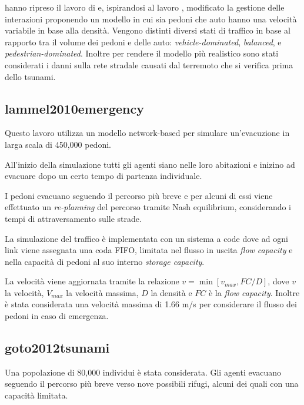 \textcite{wang2021novel} hanno ripreso il lavoro di \textcite{wang2016agent} e, 
ispirandosi al lavoro \textcite{goto2012tsunami}, modificato la gestione delle interazioni proponendo un modello in cui sia pedoni che auto hanno una velocità variabile in base alla densità.
Vengono distinti diversi stati di traffico in base al rapporto tra il volume dei pedoni e delle auto: \textit{vehicle-dominated}, \textit{balanced}, e \textit{pedestrian-dominated}. 
Inoltre per rendere il modello più realistico sono stati considerati i danni sulla rete stradale causati dal terremoto che si verifica prima dello tsunami.


\subsection{lammel2010emergency}
Questo lavoro utilizza un modello network-based per simulare un'evacuzione in larga scala di 450,000 pedoni.

All'inizio della simulazione tutti gli agenti siano nelle loro abitazioni 
e inizino ad evacuare dopo un certo tempo di partenza individuale.

I pedoni evacuano seguendo il percorso più breve e per alcuni di essi viene effettuato un \textit{re-planning} del percorso tramite Nash equilibrium,
considerando i tempi di attraversamento sulle strade.

La simulazione del traffico è implementata con un sistema a code dove ad ogni link viene assegnata una coda FIFO, 
limitata nel flusso in uscita \textit{flow capacity} e nella capacità di pedoni al suo interno \textit{storage capacity}.

La velocità viene aggiornata tramite la relazione $v = \min[v_{max}, FC / D]$, dove $v$ la velocità,
$V_{max}$ la velocità massima, $D$ la densità e $FC$ è la \textit{flow capacity}.
%
Inoltre è stata considerata una velocità massima di 1.66 m/s per considerare il
flusso dei pedoni in caso di emergenza.

\newpage


\subsection{goto2012tsunami}
Una popolazione di 80,000 individui è stata considerata.
Gli agenti evacuano seguendo il percorso più breve verso nove possibili rifugi, alcuni dei quali con una capacità limitata.

\vspace*{5mm}

